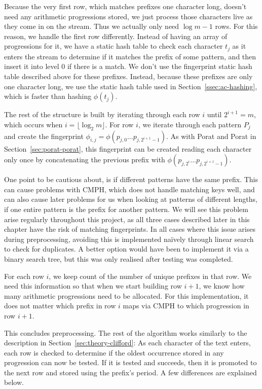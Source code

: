 \documentclass[ %
                    author={Dominic Joseph Moylett},
                    degree={MEng},
                     title={Dictionary Matching with Fingerprints},
                  subtitle={An Empirical Analysis},
                      type={research},
                      year={2015} ]{dissertation}
\begin{document}
Because the very first row, which matches prefixes one character long, doesn't need any arithmetic progressions stored, we just process those characters live as they come in on the stream. Thus we actually only need $\log m - 1$ rows. For this reason, we handle the first row differently. Instead of having an array of progressions for it, we have a static hash table to check each character $t_j$ as it enters the stream to determine if it matches the prefix of some pattern, and then insert it into level 0 if there is a match. We don't use the fingerprint static hash table described above for these prefixes. Instead, because these prefixes are only one character long, we use the static hash table used in Section~\ref{ssec:ac-hashing}, which is faster than hashing $\phi(t_j)$.

The rest of the structure is built by iterating through each row $i$ until $2^{i+1} = m$, which occurs when $i = \lfloor\log_2m\rfloor$. For row $i$, we iterate through each pattern $P_j$ and create the fingerprint $\phi_{i,j} = \phi(p_{j,0}...p_{j,2^{i + 1} - 1})$. As with Porat and Porat in Section~\ref{sec:porat-porat}, this fingerprint can be created reading each character only once by concatenating the previous prefix with $\phi(p_{j,2^{i}}...p_{j,2^{i + 1} - 1})$.

One point to be cautious about, is if different patterns have the same prefix. This can cause problems with CMPH, which does not handle matching keys well, and can also cause later problems for us when looking at patterns of different lengths, if one entire pattern is the prefix for another pattern. We will see this problem arise regularly throughout this project, as all three cases described later in this chapter have the risk of matching fingerprints. In all cases where this issue arises during preprocessing, avoiding this is implemented na\"{i}vely through linear search to check for duplicates. A better option would have been to implement it via a binary search tree, but this was only realised after testing was completed.

For each row $i$, we keep count of the number of unique prefixes in that row. We need this information so that when we start building row $i+1$, we know how many arithmetic progressions need to be allocated. For this implementation, it does not matter which prefix in row $i$ maps via CMPH to which progression in row $i+1$.

This concludes preprocessing. The rest of the algorithm works similarly to the description in Section~\ref{sec:theory-clifford}: As each character of the text enters, each row is checked to determine if the oldest occurrence stored in any progression can now be tested. If it is tested and succeeds, then it is promoted to the next row and stored using the prefix's period. A few differences are explained below.
\end{document}

